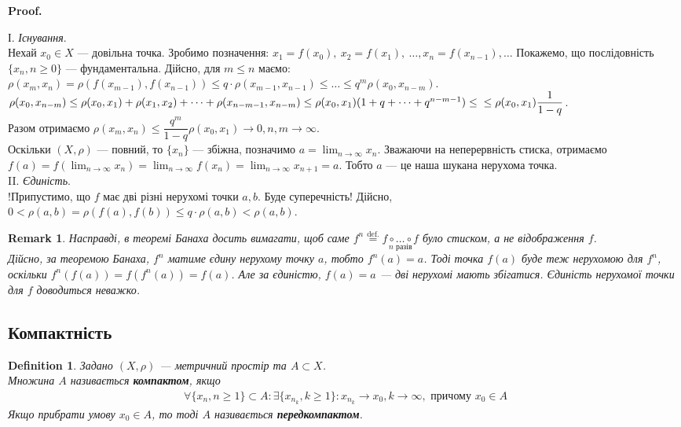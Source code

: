 \documentclass[a4paper, 10pt]{article}
\makeatletter
\theoremstyle{theoremdd}
\theoremstyle{theoremdd}
\newtheorem{definition}[theorem]{Definition}
\theoremstyle{theoremdd}
\theoremstyle{theoremdd}
\theoremstyle{theoremdd}
\theoremstyle{theoremdd}
\newtheorem{remark}[theorem]{Remark}
\theoremstyle{theoremdd}
\theoremstyle{theoremdd}
\renewenvironment{proof}[1][Proof.\\]{\par
\pushQED{\hfill \qed}%
\normalfont \topsep6\p@\@plus6\p@\relax
\trivlist
\item\relax
{\bfseries
#1\@addpunct{.}}\hspace\labelsep\ignorespaces
}{%
\popQED\endtrivlist\@endpefalse
}
\makeatother
\begin{document}
\begin{proof}
І. \textit{Існування}.\\
Нехай $x_0 \in X$ --- довільна точка. Зробимо позначення: $x_1 = f(x_0),\ x_2 = f(x_1),\ \dots, x_n = f(x_{n-1}), \dots$ Покажемо, що послідовність $\{x_n, n \geq 0\}$ --- фундаментальна. Дійсно, для $m \leq n$ маємо:\\
$\rho(x_m, x_n) = \rho(f(x_{m-1}), f(x_{n-1})) \leq q \cdot \rho(x_{m-1},x_{n-1}) \leq \dots \leq q^m \rho(x_0,x_{n-m})$.\\
$\rho(x_0,x_{n-m}) \leq \rho(x_0,x_1) + \rho(x_1,x_2) + \dots + \rho(x_{n-m-1}, x_{n-m}) \leq \rho(x_0,x_1)(1+q+\dots+q^{n-m-1}) \leq \\
\leq \rho (x_0,x_1) \dfrac{1}{1-q}$.\\
Разом отримаємо $\rho(x_m,x_n) \leq \dfrac{q^m}{1-q} \rho(x_0,x_1) \to 0, n,m \to \infty$.\\
Оскільки $(X,\rho)$ --- повний, то $\{x_n\}$ --- збіжна, позначимо $a = \displaystyle\lim_{n \to \infty} x_n$. Зважаючи на неперервність стиска, отримаємо $\displaystyle f(a) = f\left( \lim_{n \to \infty} x_n \right) = \lim_{n \to \infty} f(x_n) = \lim_{n \to \infty} x_{n+1} = a$. Тобто $a$ --- це наша шукана нерухома точка.
\bigskip \\
II. \textit{Єдиність}.\\
!Припустимо, що $f$ має дві різні нерухомі точки $a,b$. Буде суперечність! Дійсно,\\
$0 < \rho(a,b) = \rho(f(a),f(b)) \leq q \cdot \rho(a,b) < \rho(a,b)$.
\end{proof}

\begin{remark}
Насправді, в теоремі Банаха досить вимагати, щоб саме $f^n \overset{\text{def.}}{=} \underset{n\text{ разів}}{f \circ \dots \circ f}$ було стиском, а не відображення $f$.\\
Дійсно, за теоремою Банаха, $f^n$ матиме єдину нерухому точку $a$, тобто $f^n(a) = a$. Тоді точка $f(a)$ буде теж нерухомою для $f^n$, оскільки $f^n(f(a)) = f(f^n(a)) = f(a)$. Але за єдиністю, $f(a) = a$ --- дві нерухомі мають збігатися. Єдиність нерухомої точки для $f$ доводиться неважко.
\end{remark}

\subsection{Компактність}
\begin{definition}
Задано $(X,\rho)$ --- метричний простір та $A \subset X$.\\
Множина $A$ називається \textbf{компактом}, якщо
\begin{align*}
\forall \{x_n, n \geq 1\} \subset A: \exists \{x_{n_k}, k \geq 1\}: x_{n_k} \to x_0, k \to \infty, \text{ причому } x_0 \in A
\end{align*}
Якщо прибрати умову $x_0 \in A$, то тоді $A$ називається \textbf{передкомпактом}.
\end{definition}
\end{document}
